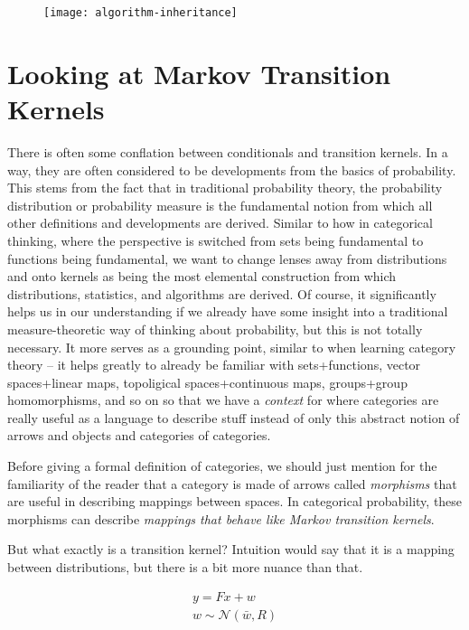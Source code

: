 \begin{figure}[htb]
    \texttt{[image: algorithm-inheritance]}
	\caption{}
    \label{fig:algorithm-inheritance}
\end{figure}

\chapter{Looking at Markov Transition Kernels}

There is often some conflation between conditionals and transition kernels.
In a way, they are often considered to be developments from the basics of probability.
This stems from the fact that in traditional probability theory, the probability distribution or probability measure is the fundamental notion from which all other definitions and developments are derived.
Similar to how in categorical thinking, where the perspective is switched from sets being fundamental to functions being fundamental, we want to change lenses away from distributions and onto kernels as being the most elemental construction from which distributions, statistics, and algorithms are derived. 
Of course, it significantly helps us in our understanding if we already have some insight into a traditional measure-theoretic way of thinking about probability, but this is not totally necessary.
It more serves as a grounding point, similar to when learning category theory -- it helps greatly to already be familiar with sets+functions, vector spaces+linear maps, topoligical spaces+continuous maps, groups+group homomorphisms, and so on so that we have a \emph{context} for where categories are really useful as a language to describe stuff instead of only this abstract notion of arrows and objects and categories of categories.

Before giving a formal definition of categories, we should just mention for the familiarity of the reader that a category is made of arrows called \emph{morphisms} that are useful in describing mappings between spaces. In categorical probability, these morphisms can describe \emph{mappings that behave like Markov transition kernels}.

But what exactly is a transition kernel?
Intuition would say that it is a mapping between distributions, but there is a bit more nuance than that.

\newcommand{\normal}{\mathcal{N}}
\newcommand{\reals}{\mathds{R}}
\begin{equation}
\label{traditional-gaussian-model}
\begin{gathered}
    y = Fx + w \\
    w \sim \normal(\bar{w}, R)
\end{gathered}
\end{equation}

